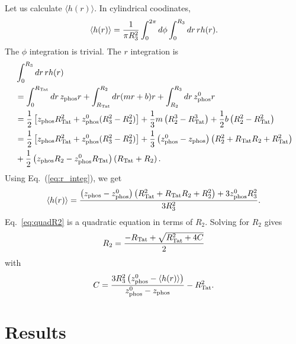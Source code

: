 Let us calculate $\langle h(r) \rangle$. In cylindrical coodinates, 
\begin{equation}
  \langle h(r) \rangle 
  = \frac{1}{\pi R_3^2} \int_0^{2\pi}d\phi \int_0^{R_3}\mathop{dr} rh(r).
\end{equation}
The $\phi$ integration is trivial. The $r$ integration is
\begin{align}
  & \int_0^{R_3}\mathop{dr} rh(r) \nonumber\\
  &= \int_0^{R_\textrm{Tat}}\mathop{dr} z_\textrm{phos} r + \int_{R_\textrm{Tat}}^{R_2}\mathop{dr} (mr+b)r + \int_{R_2}^{R_3}\mathop{dr} z_\textrm{phos}^0r \nonumber\\
  &= \frac{1}{2}\left[z_\textrm{phos} R_\textrm{Tat}^2+z_\textrm{phos}^0(R_3^2-R_2^2)\right] + 
     \frac{1}{3}m\left(R_2^3-R_\textrm{Tat}^3\right) + 
     \frac{1}{2}b\left(R_2^2-R_\textrm{Tat}^2\right) \nonumber\\        
  &= \frac{1}{2}\left[z_\textrm{phos} R_\textrm{Tat}^2+z_\textrm{phos}^0(R_3^2-R_2^2)\right] +
     \frac{1}{3}\left(z_\textrm{phos}^0-z_\textrm{phos}\right)\left(R_2^2+R_\textrm{Tat} R_2+R_\textrm{Tat}^2\right) \nonumber\\
  &  + \frac{1}{2}\left(z_\textrm{phos} R_2-z_\textrm{phos}^0 R_\textrm{Tat}\right)\left(R_\textrm{Tat}+R_2\right). 
  \label{eq:r_integ}
\end{align}
Using Eq.~(\ref{eq:r_integ}), we get 
\begin{equation}
  \langle h(r) \rangle 
  = \frac{\left(z_\textrm{phos}-z_\textrm{phos}^0\right)\left(R_\textrm{Tat}^2+R_\textrm{Tat} R_2+R_2^2\right)+3z_\textrm{phos}^0R_3^2}{3R_3^2}.
  \label{eq:quadR2}
\end{equation}
Eq.~\ref{eq:quadR2} is a quadratic equation in terms of $R_2$. 
Solving for $R_2$ gives
\begin{equation}
  R_2 = \frac{-R_\textrm{Tat}+\sqrt{R_\textrm{Tat}^2+4C}}{2} 
\end{equation}
with
\begin{equation}
  C = \frac{3R_3^2\left(z_\textrm{phos}^0-\langle h(r)\rangle\right)}{z_\textrm{phos}^0-z_\textrm{phos}} - R_\textrm{Tat}^2.
\end{equation}

\section{Results}
